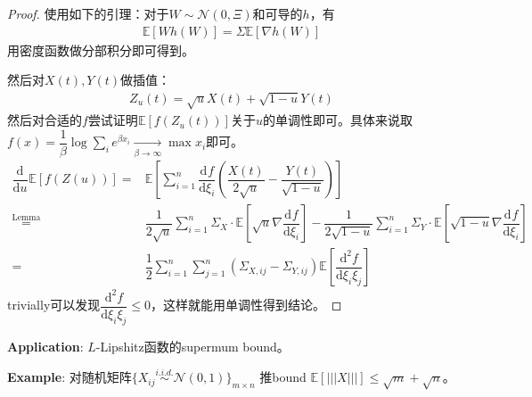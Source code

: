 \documentclass[11pt,a4paper]{ctexart}
\numberwithin{equation}{section}%
\begin{document}
\begin{proof}
    使用如下的引理：对于$ W\sim \mathcal{N}(0,\Xi) $和可导的$ h $，有
    \begin{align*}
        \mathbb{E}\left[ Wh(W) \right]   = \Sigma \mathbb{E}\left[ \nabla h(W) \right]  
    \end{align*}
    用密度函数做分部积分即可得到。

    然后对$ X(t),Y(t) $做插值：
    \begin{align*}
        Z_u(t)=\sqrt{u}X(t)+\sqrt{1-u}Y(t) 
    \end{align*}
    然后对合适的$ f $尝试证明$ \mathbb{E}\left[ f( Z_u(t) ) \right] $关于$ u $的单调性即可。具体来说取$ f(x)=\dfrac{ 1 }{ \beta  } \log \sum_i e^{\beta x_i}\mathop{ \to  }\limits_{\beta \to \infty} \max x_i  $即可。
    \begin{align*}
        \dfrac{\mathrm{d}^{}  }{\mathrm{d} u ^{} }\mathbb{E}\left[ f(Z(u)) \right]=&   \mathbb{E}\left[ \sum_{i=1}^n \dfrac{\mathrm{d}^{} f  }{\mathrm{d} \xi _i^{} } \left( \dfrac{ X(t) }{ 2\sqrt{u} } - \dfrac{ Y(t) }{ \sqrt{1-u} }   \right) \right] \\
        \mathop{ = }\limits^{\text{Lemma}}&  \dfrac{ 1 }{ 2\sqrt{u} } \sum_{i=1}^n \Sigma_X \cdot  \mathbb{E}\left[\sqrt{u} \nabla \dfrac{\mathrm{d}^{} f }{\mathrm{d} \xi _i^{} } \right] - \dfrac{ 1 }{ 2\sqrt{1-u} } \sum_{i=1}^n \Sigma_Y \cdot  \mathbb{E}\left[ \sqrt{1-u} \nabla \dfrac{\mathrm{d}^{} f }{\mathrm{d} \xi _i^{} } \right] \\
        =& \dfrac{ 1 }{ 2 } \sum_{i=1}^n\sum_{j=1}^n (\Sigma _{X,ij}-\Sigma _{Y,ij}) \mathbb{E}\left[ \dfrac{\mathrm{d}^{2} f }{\mathrm{d} \xi _i\xi _j^{} }\right] 
    \end{align*}
    trivially可以发现$ \dfrac{\mathrm{d}^{2} f }{\mathrm{d} \xi _i\xi _j^{} } \leq 0$，这样就能用单调性得到结论。
    
    
\end{proof}

\textbf{Application}: $ L $-Lipshitz函数的supermum bound。

\textbf{Example}: 对随机矩阵$ \{X_{ij} \mathop{ \sim  }\limits^{i.i.d.} \mathcal{N}(0,1) \}_{m\times n} $ 推bound $ \mathbb{E}\left[ |||X||| \right] \leq \sqrt{m}+\sqrt{n} $。
\end{document}
